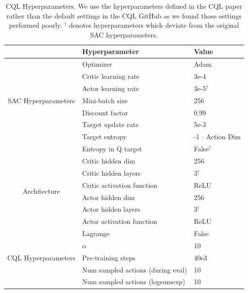 \documentclass{article}
\begin{document}
\begin{table}
\centering
\begin{tabular}{cll}
\toprule
& Hyperparameter & Value \\
\midrule
\multirow{7}{*}{SAC Hyperparameters} & Optimizer & Adam~\citep{adam}    \\
                                      & Critic learning rate & 3e-4       \\
                                      & Actor learning rate  & 3e-5$^\dagger$       \\
                                      & Mini-batch size      & 256        \\
                                      & Discount factor      & 0.99       \\
                                      & Target update rate   & 5e-3   \\
                                      & Target entropy       & -1 $\cdot$ Action Dim \\
                                      & Entropy in Q target  & False$^\dagger$  \\ 
\midrule
\multirow{6}{*}{Architecture}         & Critic hidden dim    & 256        \\
                                      & Critic hidden layers & 3$^\dagger$          \\
                                      & Critic activation function & ReLU \\
                                      & Actor hidden dim     & 256        \\
                                      & Actor hidden layers  & 3$^\dagger$          \\
                                      & Actor activation function & ReLU \\
\midrule
\multirow{5}{*}{CQL Hyperparameters}  & Lagrange             & False      \\
                                      & $\alpha$                & 10         \\
                                      & Pre-training steps   & 40e3       \\
                                      & Num sampled actions (during eval) & 10 \\
                                      & Num sampled actions (logsumexp) & 10 \\
\bottomrule
\end{tabular}
\vspace{6pt}
\caption{CQL Hyperparameters. We use the hyperparameters defined in the CQL paper rather than the default settings in the CQL GitHub as we found those settings performed poorly. $^\dagger$ denotes hyperparameters which deviate from the original SAC hyperparameters.}\label{table:cql_hyp}
\end{table}
\end{document}
